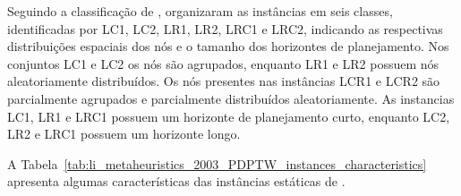 Seguindo a classificação de \textcite{solomon_algorithms_1987},  
\textcite{li_metaheuristic_2003} organizaram as instâncias em seis classes, 
identificadas por LC1, LC2, LR1, LR2, LRC1 e LRC2, indicando as respectivas 
distribuições espaciais dos nós e o tamanho dos horizontes de planejamento.
Nos conjuntos LC1 e LC2 os nós são agrupados, enquanto LR1 e LR2 possuem nós 
aleatoriamente distribuídos.
Os nós presentes nas instâncias LCR1 e LCR2 são parcialmente agrupados e 
parcialmente distribuídos aleatoriamente.
As instancias LC1, LR1 e LRC1 possuem um horizonte de planejamento curto, 
enquanto LC2, LR2 e LRC1 possuem um horizonte longo.


A Tabela~\ref{tab:li_metaheuristics_2003_PDPTW_instances_characteristics}
apresenta algumas características das instâncias estáticas de
\textcite{li_metaheuristic_2003}.

